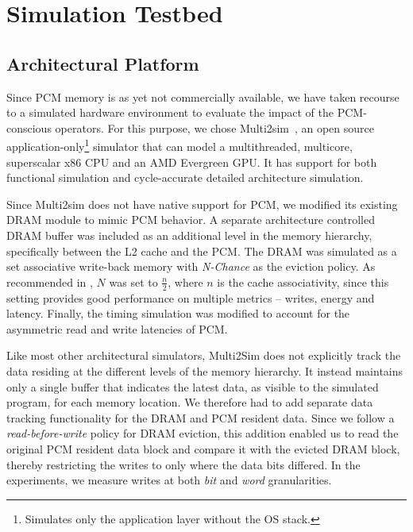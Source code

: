 \section{Simulation Testbed}
\label{sec:exp}
\subsection{Architectural Platform}
Since PCM memory is as yet not commercially available, we
have taken recourse to a simulated hardware environment to
evaluate the impact of the PCM-conscious operators.  For this
purpose, we chose Multi2sim~\cite{multi2sim}, an open source
application-only\footnote{Simulates only the application layer without
the OS stack.} simulator that can model a multithreaded, multicore,
superscalar x86 CPU and an AMD Evergreen GPU. It has support for both
functional simulation and cycle-accurate detailed architecture simulation.

Since Multi2sim does not have native support for PCM, we modified its
existing DRAM module to mimic PCM behavior.  A separate architecture
controlled DRAM buffer was included as an additional level in the memory
hierarchy, specifically between the L2 cache and the PCM. The DRAM was
simulated as a set associative write-back memory with \textit{N-Chance}
as the eviction policy. As recommended in \cite{nchance}, $N$ was set
to $\frac{n}{2}$, where $n$ is the cache associativity, since this
setting provides good performance on multiple metrics -- writes, energy
and latency.  Finally, the timing simulation was modified to account
for the asymmetric read and write latencies of PCM.


\begin{comment}
Since our experiments consider J
In our experiments, we have used $n$ to be 8, therefore making $N$ to be 4.
\end{comment}

Like most other architectural simulators, Multi2Sim does not
explicitly track the data residing at the different levels of the
memory hierarchy. It instead maintains only a single buffer that
indicates the latest data, as visible to the simulated program, for
each memory location. We therefore had to add separate data tracking
functionality for the DRAM and PCM resident data. Since we follow
a \textit{read-before-write} policy for DRAM eviction, this addition
enabled us to read the original PCM resident data block and compare
it with the evicted DRAM block, thereby restricting the writes to only
where the data bits differed. In the experiments, we measure writes at
both \textit{bit} and \textit{word} granularities.

